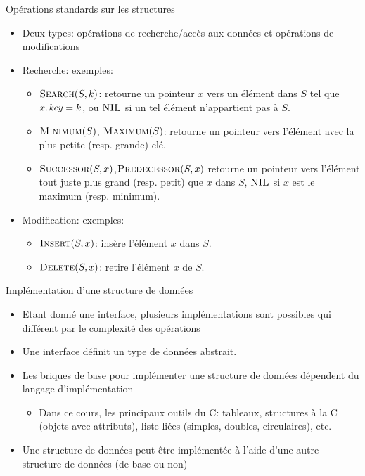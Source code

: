 \begin{frame}{Opérations standards sur les structures}

\begin{itemize}
\item Deux types: opérations de recherche/accès aux données et opérations de modifications
\item Recherche: exemples:
\begin{itemize}
\item $\textnormal{\scshape Search}(S,k)$: retourne un pointeur $x$ vers un élément dans $S$ tel que $\attrib{x}{key}=k$, ou $\textnormal{\scshape NIL}$ si un tel élément n'appartient pas à $S$.
\item $\textnormal{\scshape Minimum}(S)$, $\textnormal{\scshape Maximum}(S)$: retourne un pointeur
  vers l'élément avec la plus petite (resp. grande) clé.
\item $\textnormal{\scshape Successor}(S,x)$,$\textnormal{\scshape Predecessor}(S,x)$ retourne un pointeur vers l'élément tout juste plus grand (resp. petit) que $x$ dans $S$, $\textnormal{\scshape NIL}$ si $x$ est le maximum (resp. minimum).
\end{itemize}
\item Modification: exemples:
\begin{itemize}
\item $\textnormal{\scshape Insert}(S,x)$: insère l'élément $x$ dans $S$.
\item $\textnormal{\scshape Delete}(S,x)$: retire l'élément $x$ de $S$.
\end{itemize}
\end{itemize}

\end{frame}

\begin{frame}{Implémentation d'une structure de données}
\begin{itemize}
\item Etant donné une interface, plusieurs implémentations sont possibles qui différent par le
  \alert{complexité} des opérations
\item Une interface définit un type de données abstrait.
\item Les briques de base pour implémenter une structure de données
  dépendent du langage d'implémentation
\begin{itemize}
\item Dans ce cours, les principaux outils du C: tableaux, structures
  à la C (objets avec attributs), liste liées (simples, doubles,
  circulaires), etc.
\end{itemize}
\item Une structure de données peut être implémentée à l'aide d'une
  autre structure de données (de base ou non)
\end{itemize}
\end{frame}

